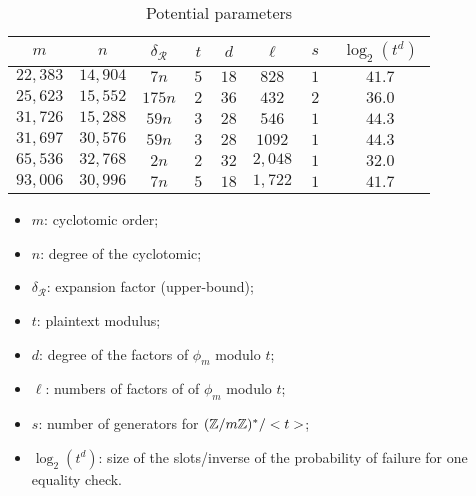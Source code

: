 \begin{table}
  \centering
  \begin{tabular}{||c|c|c||ccccc||}
    \hline
    $~m~$ & $~n~$ & $~\delta_\mathcal{R}~$ & $~t~$ & $~d~$ & $~\ell~$ & $~s~$ & $~\log_2(t^d)~$ \\
    \hline
    $22,383$ & $14,904$ & $7n$ & $5$  & $18$ & $828$  & $1$ &  $41.7$ \\
    $25,623$ & $15,552$ & $175n$ & $2$ & $36$ & $432$ & $2$ & $36.0$ \\
    $31,726$ & $15,288$ & $59n$ & $3$ & $28$ & $546$ & $1$ & $44.3$ \\
    \hline
    $31,697$ & $30,576$ & $59n$ & $3$ & $28$ & $1092$ & $1$ & $44.3$ \\
    $65,536$ & $32,768$ & $2n$ & $2$ & $32$ & $2,048$ & $1$ & $32.0$ \\
    $93,006$ & $30,996$ & $7n$ & $5$ & $18$ & $1,722$ & $1$ & $41.7$ \\
    \hline
                                                   
  \end{tabular}
  \caption{Potential parameters}
  \label{tab:params}
\end{table}

\begin{itemize}
\item $m$: cyclotomic order;
\item $n$: degree of the cyclotomic;
\item $\delta_\mathcal{R}$: expansion factor (upper-bound);
\item $t$: plaintext modulus;
\item $d$: degree of the factors of $\phi_m$ modulo $t$;
\item $\ell$: numbers of factors of of $\phi_m$ modulo $t$;
\item $s$: number of generators for $(\mathbb{Z}/m\mathbb{Z})^*/<t>$;
\item $\log_2(t^d)$: size of the slots/inverse of the probability of failure for one equality check.
\end{itemize}


